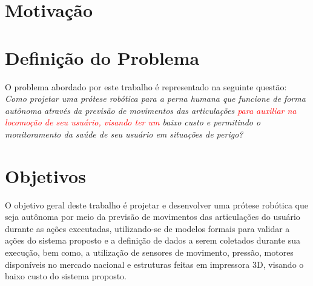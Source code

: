 
\section{Motivação}
\label{sec:motivacao}
\lipsum[6-8]

\section{Definição do Problema}
\lipsum[9-10]
O problema abordado por este trabalho é representado na seguinte questão: \textit{Como projetar uma prótese robótica para a perna humana que funcione de forma autônoma através da previsão de movimentos das articulações \textcolor{red}{para auxiliar na locomoção de seu usuário, visando ter um} baixo custo e permitindo o monitoramento da saúde de seu usuário em situações de perigo?}


\section{Objetivos}
\label{sec:objetivos}
O objetivo geral deste trabalho é projetar e desenvolver uma prótese robótica que seja autônoma por meio da previsão de movimentos das articulações do usuário durante as ações executadas, utilizando-se de modelos formais para validar a ações do sistema proposto e a definição de dados a serem coletados durante sua execução, bem como, a utilização de sensores de movimento, pressão, motores disponíveis no mercado nacional e estruturas feitas em impressora 3D, visando o baixo custo do sistema proposto.

